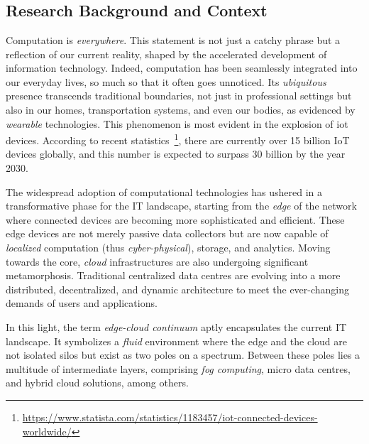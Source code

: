 \chapter{\introductionname}\label{chap:introduction}\mtcaddchapter
\minitoc%
\begin{refsection}
\section{Research Background and Context}
Computation is \textit{everywhere}. 
 This statement is not just a catchy phrase but a reflection of our current reality, 
 shaped by the accelerated development of information technology. 
 Indeed, computation has been seamlessly integrated into our everyday lives, 
 so much so that it often goes unnoticed. 
%
Its \emph{ubiquitous} presence transcends traditional boundaries, 
 not just in professional settings but also in our homes, transportation systems, 
 and even our bodies, as evidenced by \emph{wearable} technologies. 
% 
This phenomenon is most evident in the explosion of \ac{iot} devices. 
 According to recent statistics~\footnote{\url{https://www.statista.com/statistics/1183457/iot-connected-devices-worldwide/}}, 
 there are currently over 15 billion IoT devices globally, 
 and this number is expected to surpass 30 billion by the year 2030.

The widespread adoption of computational technologies has ushered in a transformative phase for the IT landscape, 
 starting from the \emph{edge} of the network where connected devices are becoming more sophisticated and efficient. 
 These edge devices are not merely passive data collectors but are now capable of \emph{localized} computation  (thus \emph{cyber-physical}), storage, and analytics. 
Moving towards the core, 
 \emph{cloud} infrastructures are also undergoing significant metamorphosis. 
 Traditional centralized data centres are evolving into a more distributed,
 decentralized, and dynamic architecture to meet the ever-changing demands of users and applications.

In this light, the term \emph{edge-cloud continuum} aptly encapsulates the current IT landscape. 
 It symbolizes a \emph{fluid} environment where the edge and the cloud are not isolated silos but exist as two poles on a spectrum. 
 Between these poles lies a multitude of intermediate layers, 
 comprising \emph{fog computing}, micro data centres, and hybrid cloud solutions, among others. 


\end{refsection}
